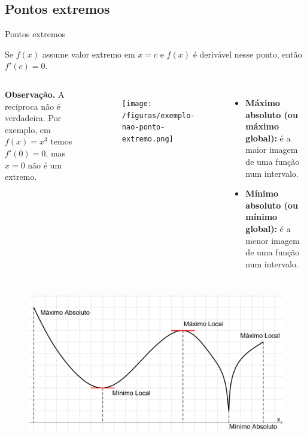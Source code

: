 \subsection{Pontos extremos}
\begin{frame}{Pontos extremos}
    \begin{theorem}
        Se $f(x)$ assume valor extremo em $x=c$ e $f(x)$ é derivável nesse ponto, então $f'(c)=0$.
    \end{theorem}
    \begin{columns}
    \textbf{Observação.} A recíproca não é verdadeira. Por exemplo, em $f(x)=x^3$ temos $f'(0)=0$, mas $x=0$ não é um extremo.
    \begin{figure}
        \centering
        \texttt{[image: /figuras/exemplo-nao-ponto-extremo.png]}
    \end{figure}        
    \begin{itemize}
        \item \textbf{Máximo absoluto (ou máximo global):} é a maior imagem de uma função num intervalo.
        \item \textbf{Mínimo absoluto (ou mínimo global):} é a menor imagem de uma função num intervalo.
    \end{itemize}        
    \end{columns}


\end{frame}

\begin{frame}{}
    \begin{figure}
        \centering
        \includegraphics[width=.9\linewidth]{figuras/fig5.png}
    \end{figure}       
\end{frame}

